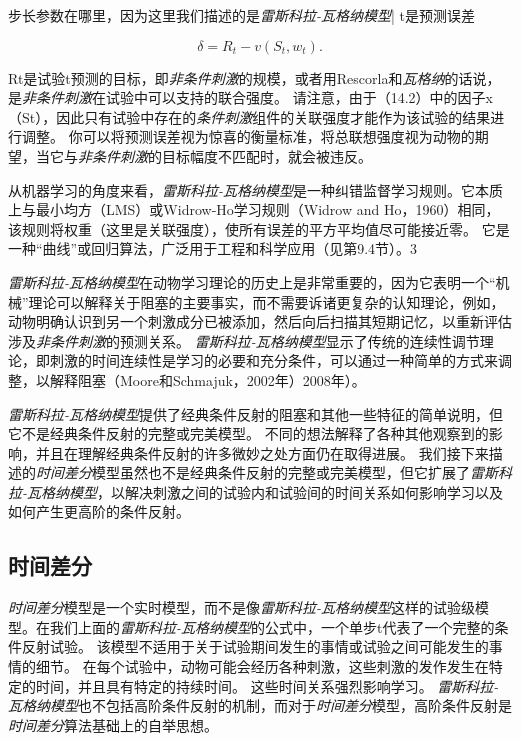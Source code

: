{步长参数在哪里，因为这里我们描述的是\textit{雷斯科拉-瓦格纳模型}| t是预测误差
	
\begin{equation}\label{key}
	\delta = R_t - v (S_t, w_t).
\end{equation}


Rt是试验t预测的目标，即\textit{非条件刺激}的规模，或者用Rescorla和\textit{瓦格纳}的话说，是\textit{非条件刺激}在试验中可以支持的联合强度。
请注意，由于（14.2）中的因子x（St），因此只有试验中存在的\textit{条件刺激}组件的关联强度才能作为该试验的结果进行调整。
你可以将预测误差视为惊喜的衡量标准，将总联想强度视为动物的期望，当它与\textit{非条件刺激}的目标幅度不匹配时，就会被违反。


从机器学习的角度来看，\textit{雷斯科拉-瓦格纳模型}是一种纠错监督学习规则。它本质上与最小均方（LMS）或Widrow-Ho学习规则（Widrow and Ho，1960）相同，该规则将权重（这里是关联强度），使所有误差的平方平均值尽可能接近零。
它是一种“曲线”或回归算法，广泛用于工程和科学应用（见第9.4节）。3


\textit{雷斯科拉-瓦格纳模型}在动物学习理论的历史上是非常重要的，因为它表明一个“机械”理论可以解释关于阻塞的主要事实，而不需要诉诸更复杂的认知理论，例如，动物明确认识到另一个刺激成分已被添加，然后向后扫描其短期记忆，以重新评估涉及\textit{非条件刺激}的预测关系。
\textit{雷斯科拉-瓦格纳模型}显示了传统的连续性调节理论，即刺激的时间连续性是学习的必要和充分条件，可以通过一种简单的方式来调整，以解释阻塞（Moore和Schmajuk，2002年）2008年）。
	
	
\textit{雷斯科拉-瓦格纳模型}提供了经典条件反射的阻塞和其他一些特征的简单说明，但它不是经典条件反射的完整或完美模型。
不同的想法解释了各种其他观察到的影响，并且在理解经典条件反射的许多微妙之处方面仍在取得进展。
我们接下来描述的\textit{时间差分}模型虽然也不是经典条件反射的完整或完美模型，但它扩展了\textit{雷斯科拉-瓦格纳模型}，以解决刺激之间的试验内和试验间的时间关系如何影响学习以及如何产生更高阶的条件反射。
	

\subsection{时间差分}

\textit{时间差分}模型是一个实时模型，而不是像\textit{雷斯科拉-瓦格纳模型}这样的试验级模型。在我们上面的\textit{雷斯科拉-瓦格纳模型}的公式中，一个单步t代表了一个完整的条件反射试验。
该模型不适用于关于试验期间发生的事情或试验之间可能发生的事情的细节。
在每个试验中，动物可能会经历各种刺激，这些刺激的发作发生在特定的时间，并且具有特定的持续时间。
这些时间关系强烈影响学习。
\textit{雷斯科拉-瓦格纳模型}也不包括高阶条件反射的机制，而对于\textit{时间差分}模型，高阶条件反射是\textit{时间差分}算法基础上的自举思想。
	
}
